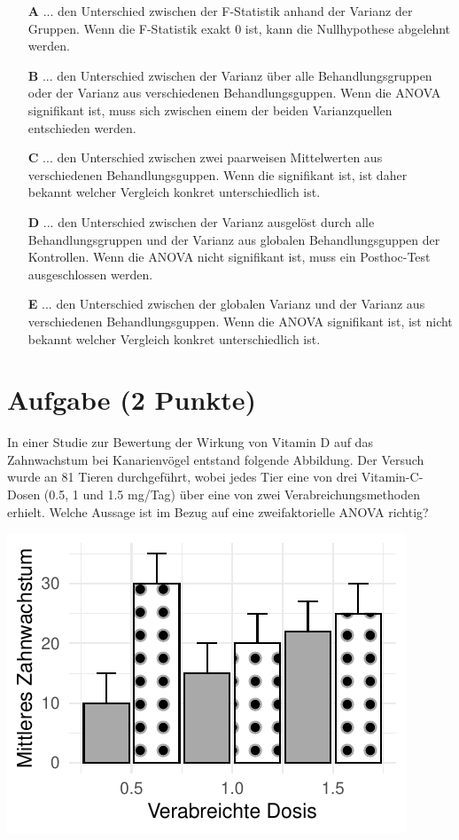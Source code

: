 \documentclass[a4paper, 9pt]{scrartcl}\usepackage[]{graphicx}\usepackage[]{xcolor}
\makeatletter
\def\maxwidth{ %
  \ifdim\Gin@nat@width>\linewidth
    \linewidth
  \else
    \Gin@nat@width
  \fi
}
\makeatother
\begin{document}
\begin{enumerate}
\item [\textbf{A} \msquare] ... den Unterschied zwischen der F-Statistik anhand der Varianz der Gruppen. Wenn die F-Statistik exakt 0 ist, kann die Nullhypothese abgelehnt werden.
\item [\textbf{B} \msquare] ... den Unterschied zwischen der Varianz über alle Behandlungsgruppen oder der Varianz aus verschiedenen Behandlungsguppen. Wenn die ANOVA signifikant ist, muss sich zwischen einem der beiden Varianzquellen entschieden werden.
\item [\textbf{C} \msquare] ... den Unterschied zwischen zwei paarweisen Mittelwerten aus verschiedenen Behandlungsguppen. Wenn die signifikant ist, ist daher bekannt welcher Vergleich konkret unterschiedlich ist.
\item [\textbf{D} \msquare] ... den Unterschied zwischen der Varianz ausgelöst durch alle Behandlungsgruppen und der Varianz aus globalen Behandlungsguppen der Kontrollen. Wenn die ANOVA nicht signifikant ist, muss ein Posthoc-Test ausgeschlossen werden.
\item [\textbf{E} \msquare] ... den Unterschied zwischen der globalen Varianz und der Varianz aus verschiedenen Behandlungsguppen. Wenn die ANOVA signifikant ist, ist nicht bekannt welcher Vergleich konkret unterschiedlich ist.
\end{enumerate} 

\section{Aufgabe \hfill (2 Punkte)}



In einer Studie zur Bewertung der Wirkung von Vitamin D auf das Zahnwachstum bei Kanarienvögel entstand folgende Abbildung. Der Versuch wurde an 81 Tieren durchgeführt, wobei jedes Tier eine von  drei Vitamin-C-Dosen (0.5, 1 und 1.5 mg/Tag) über eine von zwei Verabreichungsmethoden erhielt. Welche Aussage ist im Bezug auf eine zweifaktorielle ANOVA richtig?



{\centering \includegraphics[width=\maxwidth]{img/mc-anova-02-a-1} 

}
\end{document}
